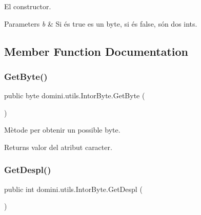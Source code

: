 El constructor. 


\begin{DoxyParams}{Parameters}
{\em b} & Si és true es un byte, si és false, són dos int\textquotesingle{}s. \\
\hline
\end{DoxyParams}


\subsection{Member Function Documentation}
\mbox{\label{classdomini_1_1utils_1_1IntorByte_afd907b7001011bbca374605fb11491f4}} 
\subsubsection{\texorpdfstring{Get\+Byte()}{GetByte()}}
{\footnotesize\ttfamily public byte domini.\+utils.\+Intor\+Byte.\+Get\+Byte (\begin{DoxyParamCaption}{ }\end{DoxyParamCaption})\hspace{0.3cm}{\ttfamily [inline]}}



Mètode per obtenir un possible byte. 

\begin{DoxyReturn}{Returns}
valor del atribut caracter. 
\end{DoxyReturn}
\mbox{\label{classdomini_1_1utils_1_1IntorByte_a5d99bc2397d586c3e3319eadf7f23e4d}} 
\subsubsection{\texorpdfstring{Get\+Despl()}{GetDespl()}}
{\footnotesize\ttfamily public int domini.\+utils.\+Intor\+Byte.\+Get\+Despl (\begin{DoxyParamCaption}{ }\end{DoxyParamCaption})\hspace{0.3cm}{\ttfamily [inline]}}



